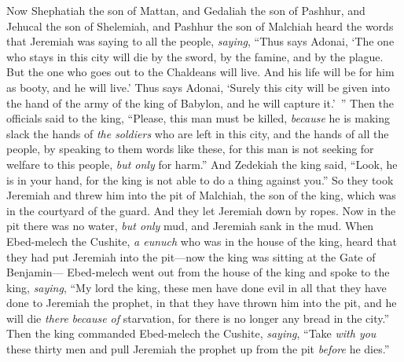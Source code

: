 \begin{biblechapter} %
 Now Shephatiah the son of Mattan, and Gedaliah the son of Pashhur, and Jehucal the son of Shelemiah, and Pashhur the son of Malchiah heard the words that Jeremiah was saying to all the people, \textit{saying},
\verse “Thus says Adonai, ‘The one who stays in this city will die by the sword, by the famine, and by the plague. But the one who goes out to the Chaldeans will live. And his life will be for him as booty, and he will live.’
\verse Thus says Adonai, ‘Surely this city will be given into the hand of the army of the king of Babylon, and he will capture it.’ ”
\verse Then the officials said to the king, “Please, this man must be killed, \textit{because} he is making slack the hands of \textit{the soldiers} who are left in this city, and the hands of all the people, by speaking to them words like these, for this man is not seeking for welfare to this people, \textit{but only} for harm.”
\verse And Zedekiah the king said, “Look, he is in your hand, for the king is not able to do a thing against you.”
\verse So they took Jeremiah and threw him into the pit of Malchiah, the son of the king, which was in the courtyard of the guard. And they let Jeremiah down by ropes. Now in the pit there was no water, \textit{but only} mud, and Jeremiah sank in the mud.
\verse When Ebed-melech the Cushite, \textit{a eunuch} who was in the house of the king, heard that they had put Jeremiah into the pit—now the king was sitting at the Gate of Benjamin—
\verse Ebed-melech went out from the house of the king and spoke to the king, \textit{saying},
\verse “My lord the king, these men have done evil in all that they have done to Jeremiah the prophet, in that they have thrown him into the pit, and he will die \textit{there} \textit{because of} starvation, for there is no longer any bread in the city.”
\verse Then the king commanded Ebed-melech the Cushite, \textit{saying}, “Take \textit{with you} these thirty men and pull Jeremiah the prophet up from the pit \textit{before} he dies.”

\end{biblechapter}
